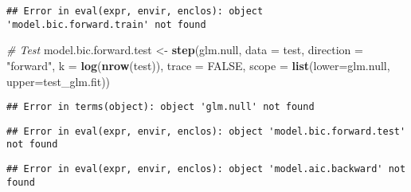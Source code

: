 \documentclass[]{article}
\newenvironment{Shaded}{\begin{snugshade}}{\end{snugshade}}
\newcommand{\CommentTok}[1]{\textcolor[rgb]{0.56,0.35,0.01}{\textit{#1}}}
\newcommand{\DataTypeTok}[1]{\textcolor[rgb]{0.13,0.29,0.53}{#1}}
\newcommand{\DecValTok}[1]{\textcolor[rgb]{0.00,0.00,0.81}{#1}}
\newcommand{\KeywordTok}[1]{\textcolor[rgb]{0.13,0.29,0.53}{\textbf{#1}}}
\newcommand{\NormalTok}[1]{#1}
\newcommand{\OperatorTok}[1]{\textcolor[rgb]{0.81,0.36,0.00}{\textbf{#1}}}
\newcommand{\OtherTok}[1]{\textcolor[rgb]{0.56,0.35,0.01}{#1}}
\newcommand{\StringTok}[1]{\textcolor[rgb]{0.31,0.60,0.02}{#1}}
\begin{document}
\begin{verbatim}
## Error in eval(expr, envir, enclos): object 'model.bic.forward.train' not found
\end{verbatim}

\begin{Shaded}
\begin{Highlighting}[]
\CommentTok{# Test}
\NormalTok{model.bic.forward.test <-}\StringTok{ }\KeywordTok{step}\NormalTok{(glm.null, }\DataTypeTok{data =}\NormalTok{ test, }\DataTypeTok{direction =} \StringTok{"forward"}\NormalTok{, }\DataTypeTok{k =} \KeywordTok{log}\NormalTok{(}\KeywordTok{nrow}\NormalTok{(test)), }\DataTypeTok{trace =} \OtherTok{FALSE}\NormalTok{,}
                          \DataTypeTok{scope =} \KeywordTok{list}\NormalTok{(}\DataTypeTok{lower=}\NormalTok{glm.null, }\DataTypeTok{upper=}\NormalTok{test_glm.fit))}
\end{Highlighting}
\end{Shaded}

\begin{verbatim}
## Error in terms(object): object 'glm.null' not found
\end{verbatim}

\begin{Shaded}
\end{Shaded}

\begin{verbatim}
## Error in eval(expr, envir, enclos): object 'model.bic.forward.test' not found
\end{verbatim}

\begin{Shaded}
\end{Shaded}

\begin{verbatim}
## Error in eval(expr, envir, enclos): object 'model.aic.backward' not found
\end{verbatim}
\end{document}
